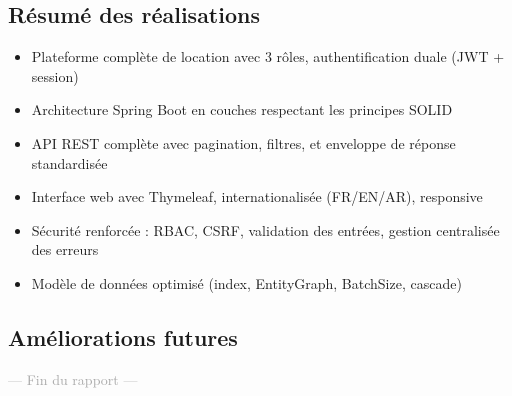 \documentclass[12pt,a4paper]{article}
\begin{document}
\subsection*{Résumé des réalisations}
\begin{itemize}[nosep, leftmargin=1.2em]
    \item Plateforme complète de location avec 3 rôles, authentification duale (JWT + session)
    \item Architecture Spring Boot en couches respectant les principes SOLID
    \item API REST complète avec pagination, filtres, et enveloppe de réponse standardisée
    \item Interface web avec Thymeleaf, internationalisée (FR/EN/AR), responsive
    \item Sécurité renforcée : RBAC, CSRF, validation des entrées, gestion centralisée des erreurs
    \item Modèle de données optimisé (index, EntityGraph, BatchSize, cascade)
\end{itemize}

\subsection*{Améliorations futures}
\begin{center}
\end{center}

\vspace{1em}
\begin{center}
\small\textcolor{darkgray}{--- Fin du rapport ---}
\end{center}
\end{document}
